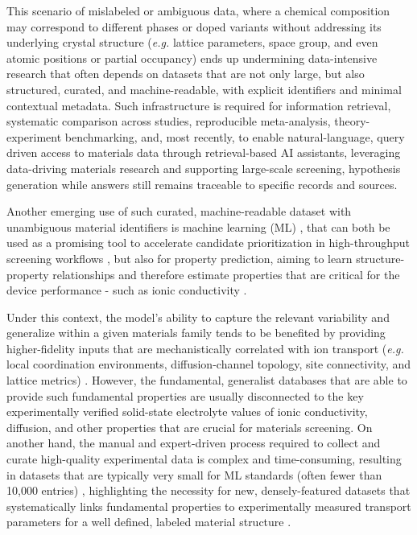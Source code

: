 \documentclass[a4paper,fleqn]{cas-sc}
\begin{document}
This scenario of mislabeled or ambiguous data, where a chemical composition may correspond to different phases or doped variants without addressing its underlying crystal structure (\textit{e.g.} lattice parameters, space group, and even atomic positions or partial occupancy) \cite{therrien2025obelix, mishra2023exploring} ends up undermining data-intensive research that often depends on datasets that are not only large, but also structured, curated, and machine-readable, with explicit identifiers and minimal contextual metadata. Such infrastructure is required for information retrieval, systematic comparison across studies, reproducible meta-analysis, theory-experiment benchmarking, and, most recently, to enable natural-language, query driven access to materials data through retrieval-based AI assistants, leveraging data-driving materials research and supporting large-scale screening, hypothesis generation \cite{ye2018harnessing} while answers still remains traceable to specific records and sources. 

Another emerging use of such curated, machine-readable dataset with unambiguous material identifiers is machine learning (ML) \cite{hargreaves2023database}, that can both be used as a promising tool to accelerate candidate prioritization in high-throughput screening workflows \cite{yang2024dynamic}, but also for property prediction, aiming to learn structure-property relationships and therefore estimate properties that are critical for the device performance - such as ionic conductivity \cite{yu2025data, mishra2023exploring}.

Under this context, the model's ability to capture the relevant variability and generalize within a given materials family tends to be benefited by providing higher-fidelity inputs that are mechanistically correlated with ion transport (\textit{e.g.} local coordination environments, diffusion-channel topology, site connectivity, and lattice metrics) \cite{hargreaves2023database}. However, the fundamental, generalist databases that are able to provide such fundamental properties are usually disconnected to the key experimentally verified solid-state electrolyte values of ionic conductivity, diffusion, and other properties that are crucial for materials screening. On another hand, the manual and expert-driven process required to collect and curate high-quality experimental data is complex and time-consuming, resulting in datasets that are typically very small for ML standards (often fewer than 10,000 entries) \cite{hargreaves2023database}, highlighting the necessity for new, densely-featured datasets that systematically links fundamental properties to experimentally measured transport parameters for a well defined, labeled material structure \cite{therrien2025obelix} . 
\end{document}
